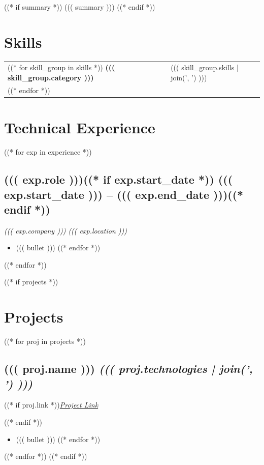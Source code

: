 \documentclass[letter,10pt]{article}
\newenvironment{zitemize}{
\begin{itemize} \itemsep 0pt \parskip 0pt \parsep 1pt}
{\end{itemize}\vspace{-.5em}}
\newcommand{\skills}[1]{ {\bfseries #1}}
\newcommand{\subtext}[1]{\textit{#1}\par\vspace{-.75em}}
\begin{document}
((* if summary *))
((( summary )))
\vspace{1em}
((* endif *))

\section{Skills}
\begin{tabular}{p{12em} p{1em} p{42em}}
((* for skill_group in skills *))
\skills{((( skill_group.category )))} & & ((( skill_group.skills | join(', ') ))) \\
((* endfor *))
\end{tabular}

\section{Technical Experience}
((* for exp in experience *))
\subsection{{((( exp.role )))((* if exp.start_date *)) \hfill ((( exp.start_date ))) -- ((( exp.end_date )))((* endif *))}}
\subtext{((( exp.company ))) \hfill ((( exp.location )))}
\begin{zitemize}
((* for bullet in exp.bullets *))
\item ((( bullet )))
((* endfor *))
\end{zitemize}
((* endfor *))

((* if projects *))
\section{Projects}
((* for proj in projects *))
\subsection{{((( proj.name ))) \hfill \emph{((( proj.technologies | join(', ') )))}}}
((* if proj.link *))\subtext{\href{((( proj.link )))}{Project Link}}((* endif *))
\begin{zitemize}
((* for bullet in proj.bullets *))
\item ((( bullet )))
((* endfor *))
\end{zitemize}
((* endfor *))
((* endif *))

\end{document}
